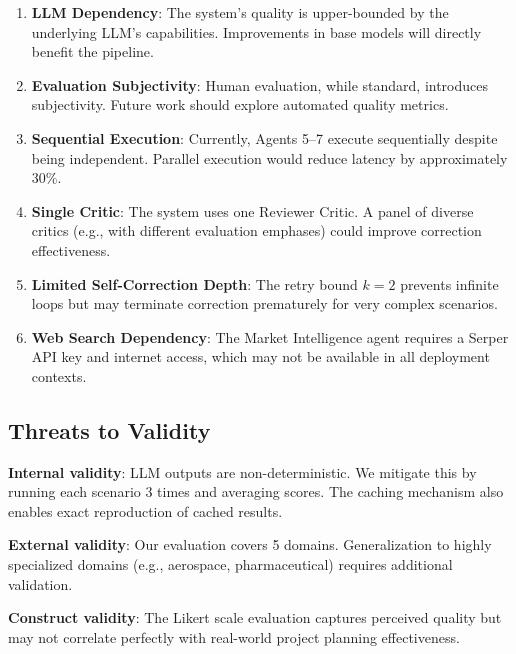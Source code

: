 \documentclass[journal]{IEEEtran}
\begin{document}
\begin{enumerate}
    \item \textbf{LLM Dependency}: The system's quality is upper-bounded by the underlying LLM's capabilities. Improvements in base models will directly benefit the pipeline.
    
    \item \textbf{Evaluation Subjectivity}: Human evaluation, while standard, introduces subjectivity. Future work should explore automated quality metrics.
    
    \item \textbf{Sequential Execution}: Currently, Agents 5--7 execute sequentially despite being independent. Parallel execution would reduce latency by approximately 30\%.
    
    \item \textbf{Single Critic}: The system uses one Reviewer Critic. A panel of diverse critics (e.g., with different evaluation emphases) could improve correction effectiveness.
    
    \item \textbf{Limited Self-Correction Depth}: The retry bound $k=2$ prevents infinite loops but may terminate correction prematurely for very complex scenarios.
    
    \item \textbf{Web Search Dependency}: The Market Intelligence agent requires a Serper API key and internet access, which may not be available in all deployment contexts.
\end{enumerate}

\subsection{Threats to Validity}

\textbf{Internal validity}: LLM outputs are non-deterministic. We mitigate this by running each scenario 3 times and averaging scores. The caching mechanism also enables exact reproduction of cached results.

\textbf{External validity}: Our evaluation covers 5 domains. Generalization to highly specialized domains (e.g., aerospace, pharmaceutical) requires additional validation.

\textbf{Construct validity}: The Likert scale evaluation captures perceived quality but may not correlate perfectly with real-world project planning effectiveness.

\end{document}
